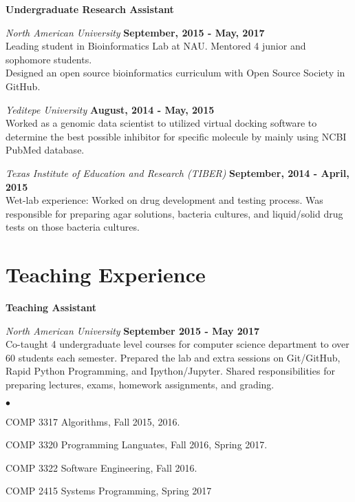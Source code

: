 \documentclass[margin,line]{res}
\newenvironment{list2}{
  \begin{list}{$\bullet$}{%
      \setlength{\itemsep}{0in}
      \setlength{\parsep}{0in} \setlength{\parskip}{0in}
      \setlength{\topsep}{0in} \setlength{\partopsep}{0in} 
      \setlength{\leftmargin}{0.2in}}}{\end{list}}
\begin{document}
\begin{resume}
{\bf Undergraduate Research Assistant}

\vspace{-.3cm}
{\em North American University} \hfill {\bf September, 2015 - May, 2017}\\
Leading student in Bioinformatics Lab at NAU. Mentored 4 junior and sophomore students.\\
Designed an open source bioinformatics curriculum with Open Source Society in GitHub.

{\em Yeditepe University} \hfill {\bf August, 2014 - May, 2015}\\
Worked as a genomic data scientist to utilized virtual docking software to determine the best possible inhibitor for specific molecule by mainly using NCBI PubMed database.  

{\em Texas Institute of Education and Research (TIBER)} \hfill {\bf September, 2014 - April, 2015}\\
Wet-lab experience: Worked on drug development and testing process. Was responsible for preparing agar solutions, bacteria cultures, and liquid/solid drug tests on those bacteria cultures. 


\section{\sc Teaching Experience}
{\bf Teaching Assistant}

\vspace{-.3cm}
{\em North American University} \hfill {\bf September 2015 - May 2017}\\
Co-taught 4 undergraduate level courses for computer science department to over 60 students each semester. Prepared the lab and extra sessions on Git/GitHub, Rapid Python Programming, and Ipython/Jupyter. Shared responsibilities for preparing lectures, exams, homework assignments, and  grading.
\vspace*{.05in}  
\begin{list2}
\item COMP 3317 Algorithms, Fall 2015, 2016.
\item COMP 3320 Programming Languates, Fall 2016, Spring 2017.
\item COMP 3322 Software Engineering, Fall 2016.
\item COMP 2415 Systems Programming, Spring 2017
\end{list2}



\end{resume}
\end{document}
